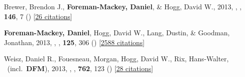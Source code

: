 \item[{\color{numcolor}\scriptsize3}] Brewer, Brendon J., \textbf{Foreman-Mackey, Daniel}, \& Hogg, David W., 2013, , \aj, \textbf{146}, 7 () [\href{http://adsabs.harvard.edu/abs/2013AJ....146....7B}{26 citations}]

\item[{\color{numcolor}\scriptsize2}] \textbf{Foreman-Mackey, Daniel}, Hogg, David W., Lang, Dustin, \& Goodman, Jonathan, 2013, , \pasp, \textbf{125}, 306 () [\href{http://adsabs.harvard.edu/abs/2013PASP..125..306F}{2588 citations}]

\item[{\color{numcolor}\scriptsize1}] Weisz, Daniel R., Fouesneau, Morgan, Hogg, David W., Rix, Hans-Walter, \etal\ (incl.\ \textbf{DFM}), 2013, , \apj, \textbf{762}, 123 () [\href{http://adsabs.harvard.edu/abs/2013ApJ...762..123W}{28 citations}]